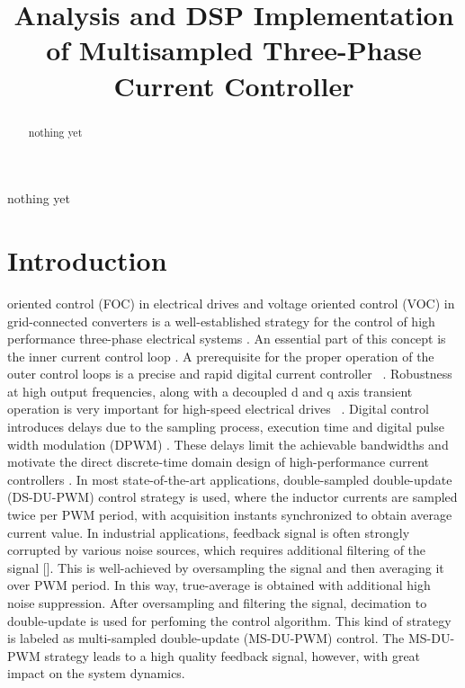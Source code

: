 \documentclass[journal]{IEEEtran}
\begin{document}
\title{Analysis and DSP Implementation of Multisampled Three-Phase Current Controller}


\maketitle

\begin{abstract}
nothing yet
\end{abstract}

\begin{IEEEkeywords}
nothing yet
\end{IEEEkeywords}


\IEEEpeerreviewmaketitle

\section{Introduction}
 oriented control (FOC) in electrical drives and voltage oriented control (VOC) in grid-connected converters is a well-established strategy for the control of high performance three-phase electrical systems \cite{holmes2012}. An essential part of this concept is the inner current control loop \cite{holmes2009}. A prerequisite for the proper operation of the outer control loops is a precise and rapid digital current controller ~\cite{yepes2014,choi1998}. Robustness at high output frequencies, along with a decoupled d and q axis transient operation is very important for high-speed electrical drives ~\cite{choi1998,hoffmann2016,yim2009}. Digital control introduces delays due to the sampling process, execution time and digital pulse width modulation (DPWM) \cite{holmes2009}. These delays limit the achievable bandwidths and motivate the direct discrete-time domain design of high-performance current controllers \cite{bae2003}. 
In most state-of-the-art applications, double-sampled double-update (DS-DU-PWM) control strategy is used, where the inductor currents are sampled twice per PWM period, with acquisition instants synchronized to obtain average current value. In industrial applications, feedback signal is often strongly corrupted by various noise sources, which requires additional filtering of the signal []. This is well-achieved by oversampling the signal and then averaging it over PWM period. In this way, true-average is obtained with additional high noise suppression. After oversampling and filtering the signal, decimation to double-update is used for perfoming the control algorithm. This kind of strategy is labeled as multi-sampled double-update (MS-DU-PWM) control. The MS-DU-PWM strategy leads to a high quality feedback signal, however, with great impact on the system dynamics. 
\end{document}
